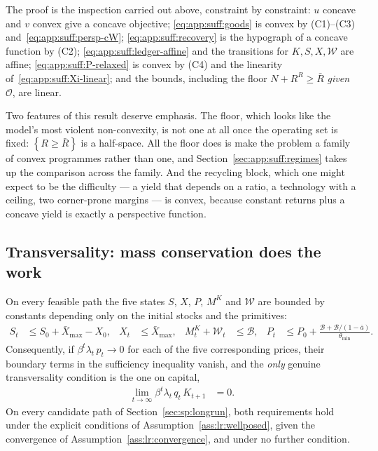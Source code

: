 The proof is the inspection carried out above, constraint by constraint: $u$ concave and $v$ convex give a concave objective; \eqref{eq:app:suff:goods} is convex by (C1)--(C3) and~\eqref{eq:app:suff:persp-cW}; \eqref{eq:app:suff:recovery} is the hypograph of a concave function by (C2); \eqref{eq:app:suff:ledger-affine} and the transitions for $K,S,X,\mathcal W$ are affine; \eqref{eq:app:suff:P-relaxed} is convex by (C4) and the linearity of~\eqref{eq:app:suff:Xi-linear}; and the bounds, including the floor $N+R^R\ge\bar R$ \emph{given} $\mathcal O$, are linear.

Two features of this result deserve emphasis. The floor, which looks like the model's most violent non-convexity, is not one at all once the operating set is fixed: $\left\{R\ge\bar R\right\}$ is a half-space. All the floor does is make the problem a family of convex programmes rather than one, and Section~\ref{sec:app:suff:regimes} takes up the comparison across the family. And the recycling block, which one might expect to be the difficulty --- a yield that depends on a ratio, a technology with a ceiling, two corner-prone margins --- is convex, because constant returns plus a concave yield is exactly a perspective function.

\subsection{Transversality: mass conservation does the work}\label{sec:app:suff:tvc}

\begin{proposition}[transversality]\label{prop:suff:tvc}
On every feasible path the five states $S$, $X$, $P$, $M^K$ and $\mathcal W$ are bounded by constants depending only on the initial stocks and the primitives:
\begin{align}
S_t &\le S_0+\bar X_{\max}-X_0,
&
X_t &\le\bar X_{\max},
&
M^K_t+\mathcal W_t &\le\mathcal B,
&
P_t &\le P_0+\frac{\mathcal B+\mathcal B/\left(1-\bar a\right)}{\theta_{\min}} .
\label{eq:app:suff:bounds}
\end{align}
Consequently, if $\beta^t\lambda_t\,p_t\to0$ for each of the five corresponding prices, their boundary terms in the sufficiency inequality vanish, and the \emph{only} genuine transversality condition is the one on capital,
\begin{align}
\lim_{t\to\infty}\beta^t\lambda_t\,q_t\,K_{t+1} &= 0 .
\label{eq:app:suff:tvc-K}
\end{align}
On every candidate path of Section~\ref{sec:sp:longrun}, both requirements hold under the explicit conditions of Assumption~\ref{ass:lr:wellposed}, given the convergence of Assumption~\ref{ass:lr:convergence}, and under no further condition.
\end{proposition}

